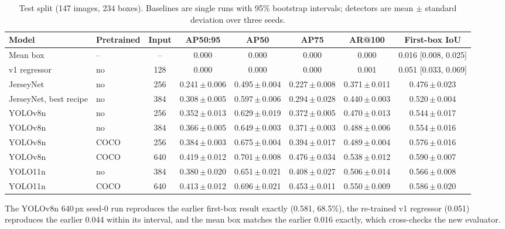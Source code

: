 \documentclass[10pt,a4paper]{article}
\newcommand{\pmv}[2]{#1\,$\pm$\,#2}
\begin{document}
\begin{table}[t]
\centering\small
\caption{Test split (147 images, 234 boxes). Baselines are single runs with 95\% bootstrap
intervals; detectors are mean $\pm$ standard deviation over three seeds.}
\label{tab:main}
\setlength{\tabcolsep}{2.5pt}
\begin{tabular}{llcccccc}
\toprule
Model & Pretrained & Input & AP50:95 & AP50 & AP75 & AR@100 & First-box IoU \\
\midrule
Mean box      & --   & --  & 0.000 & 0.000 & 0.000 & 0.000 & 0.016 [0.008, 0.025] \\
v1 regressor  & no   & 128 & 0.000 & 0.000 & 0.000 & 0.001 & 0.051 [0.033, 0.069] \\
JerseyNet     & no   & 256 & \pmv{0.241}{0.006} & \pmv{0.495}{0.004} & \pmv{0.227}{0.008} & \pmv{0.371}{0.011} & \pmv{0.476}{0.023} \\
JerseyNet, best recipe & no & 384 & \pmv{0.308}{0.005} & \pmv{0.597}{0.006} & \pmv{0.294}{0.028} & \pmv{0.440}{0.003} & \pmv{0.520}{0.004} \\
YOLOv8n       & no   & 256 & \pmv{0.352}{0.013} & \pmv{0.629}{0.019} & \pmv{0.372}{0.005} & \pmv{0.470}{0.013} & \pmv{0.544}{0.017} \\
YOLOv8n       & no   & 384 & \pmv{0.366}{0.005} & \pmv{0.649}{0.003} & \pmv{0.371}{0.003} & \pmv{0.488}{0.006} & \pmv{0.554}{0.016} \\
YOLOv8n       & COCO & 256 & \pmv{0.384}{0.003} & \pmv{0.675}{0.004} & \pmv{0.394}{0.017} & \pmv{0.489}{0.004} & \pmv{0.576}{0.016} \\
YOLOv8n       & COCO & 640 & \pmv{0.419}{0.012} & \pmv{0.701}{0.008} & \pmv{0.476}{0.034} & \pmv{0.538}{0.012} & \pmv{0.590}{0.007} \\
\midrule
YOLO11n       & no   & 384 & \pmv{0.380}{0.020} & \pmv{0.651}{0.021} & \pmv{0.408}{0.027} & \pmv{0.506}{0.014} & \pmv{0.566}{0.008} \\
YOLO11n       & COCO & 640 & \pmv{0.413}{0.012} & \pmv{0.696}{0.021} & \pmv{0.453}{0.011} & \pmv{0.550}{0.009} & \pmv{0.586}{0.020} \\
\bottomrule
\end{tabular}
\end{table}

The YOLOv8n 640\,px seed-0 run reproduces the earlier first-box result exactly (0.581, 68.5\%),
the re-trained v1 regressor (0.051) reproduces the earlier 0.044 within its interval, and the
mean box matches the earlier 0.016 exactly, which cross-checks the new evaluator.
\end{document}
